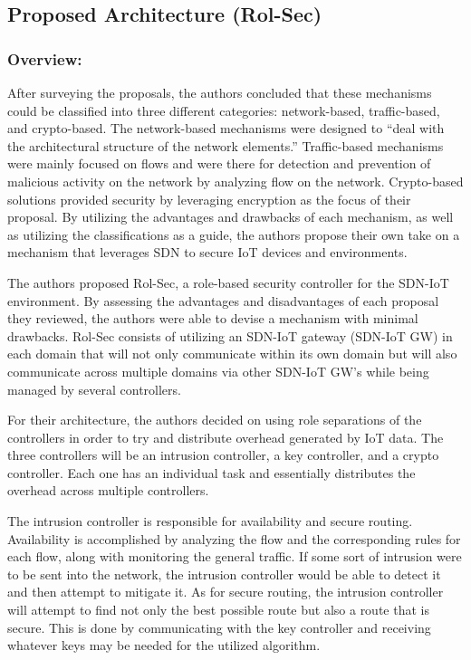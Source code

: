 \subsection {Proposed Architecture (Rol-Sec)} 
\subsubsection {Overview:}
\smallskip

After surveying the proposals, the authors concluded that these mechanisms could be classified into three different categories: network-based, traffic-based, and crypto-based. The network-based mechanisms were designed to “deal with the architectural structure of the network elements.” \cite {kalkan2017securing} Traffic-based mechanisms were mainly focused on flows and were there for detection and prevention of malicious activity on the network by analyzing flow on the network. Crypto-based solutions provided security by leveraging encryption as the focus of their proposal. By utilizing the advantages and drawbacks of each mechanism, as well as utilizing the classifications as a guide, the authors propose their own take on a mechanism that leverages SDN to secure IoT devices and environments. 

\smallskip

The authors proposed Rol-Sec, a role-based security controller for the SDN-IoT environment. By assessing the advantages and disadvantages of each proposal they reviewed, the authors were able to devise a mechanism with minimal drawbacks. Rol-Sec consists of utilizing an SDN-IoT gateway (SDN-IoT GW) in each domain that will not only communicate within its own domain but will also communicate across multiple domains via other SDN-IoT GW’s while being managed by several controllers. 

\smallskip

For their architecture, the authors decided on using role separations of the controllers in order to try and distribute overhead generated by IoT data. The three controllers will be an intrusion controller, a key controller, and a crypto controller. Each one has an individual task and essentially distributes the overhead across multiple controllers.

\smallskip

The intrusion controller is responsible for availability and secure routing. Availability is accomplished by analyzing the flow and the corresponding rules for each flow, along with monitoring the general traffic. If some sort of intrusion were to be sent into the network, the intrusion controller would be able to detect it and then attempt to mitigate it. As for secure routing, the intrusion controller will attempt to find not only the best possible route but also a route that is secure. This is done by communicating with the key controller and receiving whatever keys may be needed for the utilized algorithm. 

